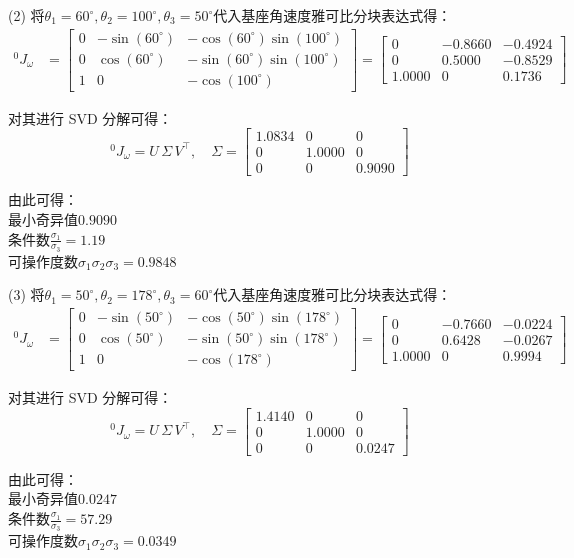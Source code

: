 \documentclass[UTF8, 12pt]{ctexart}
\begin{document}
(2)
将\(\theta_1 = 60^\circ, \theta_2 = 100^\circ, \theta_3 = 50^\circ\)代入基座角速度雅可比分块表达式得：
\[
\begin{aligned}
{}^0 J_{\omega}
&= \begin{bmatrix}
        0 & -\sin(60^\circ) & -\cos(60^\circ)\sin(100^\circ) \\
        0 & \cos(60^\circ) & -\sin(60^\circ)\sin(100^\circ) \\
        1 & 0 & -\cos(100^\circ)
    \end{bmatrix}
 = \begin{bmatrix}
        0 & -0.8660 & -0.4924 \\
        0 & 0.5000 & -0.8529 \\
        1.0000 & 0 & 0.1736
    \end{bmatrix}
\end{aligned}
\]

对其进行 SVD 分解可得：
\[
{}^0 J_{\omega} = U\, \Sigma\, V^{\top},\quad
\Sigma = \begin{bmatrix}
            1.0834 & 0 & 0 \\
            0 & 1.0000 & 0 \\
            0 & 0 & 0.9090
        \end{bmatrix}
\]

由此可得： \\
最小奇异值\(0.9090\) \\
条件数\(\frac{\sigma_1}{\sigma_3} = 1.19\) \\
可操作度数\(\sigma_1 \sigma_2 \sigma_3 = 0.9848\)
\vspace{5em}


(3)
将\(\theta_1 = 50^\circ, \theta_2 = 178^\circ, \theta_3 = 60^\circ\)代入基座角速度雅可比分块表达式得：
\[
\begin{aligned}
{}^0 J_{\omega}
&= \begin{bmatrix}
        0 & -\sin(50^\circ) & -\cos(50^\circ)\sin(178^\circ) \\
        0 & \cos(50^\circ) & -\sin(50^\circ)\sin(178^\circ) \\
        1 & 0 & -\cos(178^\circ)
    \end{bmatrix}
 = \begin{bmatrix}
        0 & -0.7660 & -0.0224 \\
        0 & 0.6428 & -0.0267 \\
        1.0000 & 0 & 0.9994
    \end{bmatrix}
\end{aligned}
\]

对其进行 SVD 分解可得：
\[
{}^0 J_{\omega} = U\, \Sigma\, V^{\top},\quad
\Sigma = \begin{bmatrix}
            1.4140 & 0 & 0 \\
            0 & 1.0000 & 0 \\
            0 & 0 & 0.0247
        \end{bmatrix}
\]

由此可得： \\
最小奇异值\(0.0247\) \\
条件数\(\frac{\sigma_1}{\sigma_3} = 57.29\) \\
可操作度数\(\sigma_1 \sigma_2 \sigma_3 = 0.0349\)
\end{document}
